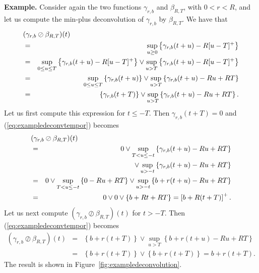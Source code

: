 {\bf Example.} Consider again the two functions $\gamma_{r,b}$ and $\beta_{R,T}$,
with $0 < r < R$, and let us compute the min-plus deconvolution of  $\gamma_{r,b}$ by $\beta_{R,T}$.
We have that
\begin{eqnarray}
\lefteqn{ (\gamma_{r,b} \oslash \beta_{R,T})(t)} \nonumber \\
        & = & \sup_{u \geq 0} \left\{ \gamma_{r,b}(t+u) -  R[u-T]^{+} \right\} \nonumber \\
        & = & \sup_{0 \leq u \leq T} \left\{ \gamma_{r,b}(t+u) -  R[u-T]^{+} \right\}
            \vee \sup_{u > T} \left\{ \gamma_{r,b}(t+u) -  R[u-T]^{+} \right\} \nonumber \\
        & = & \sup_{0 \leq u \leq T} \left\{ \gamma_{r,b}(t+u) \right\}
            \vee \sup_{u > T} \left\{ \gamma_{r,b}(t+u) -  Ru + RT \right\} \nonumber \\
        & = & \left\{ \gamma_{r,b}(t+T) \right\}
            \vee \sup_{u > T} \left\{ \gamma_{r,b}(t+u) -  Ru + RT \right\} .
\mylabel{eq:exampledeconvtempor}
\end{eqnarray}
Let us first compute this expression for $t \leq -T$. Then $\gamma_{r,b}(t+T) = 0$ and
(\ref{eq:exampledeconvtempor}) becomes
\begin{eqnarray*}
\lefteqn{(\gamma_{r,b} \oslash \beta_{R,T})(t)}\\
& = & 0 \vee
\sup_{T < u \leq -t} \left\{ \gamma_{r,b}(t+u) -  Ru + RT \right\}
\\
            & & \hspace{10 ex} \vee \sup_{u > -t} \left\{ \gamma_{r,b}(t+u) -  Ru + RT \right\} \\
        & = & 0 \vee \sup_{T < u \leq -t} \left\{ 0  -  Ru + RT \right\}
                    \vee \sup_{u > -t} \left\{ b+ r(t+u) -  Ru + RT \right\} \\
        & = & 0 \vee 0 \vee \left\{ b + Rt + RT \right\} = \left[ b + R(t+T) \right]^{+} .
\end{eqnarray*}
Let us next compute $(\gamma_{r,b} \oslash \beta_{R,T})(t)$ for $t > -T$. Then (\ref{eq:exampledeconvtempor}) becomes
\begin{eqnarray*}
(\gamma_{r,b} \oslash \beta_{R,T})(t) & = & \left\{ b + r(t+T) \right\} \vee \sup_{u > T} \left\{ b + r(t+u) -  Ru + RT \right\} \\
                & = & \left\{ b + r(t+T) \right\} \vee \left\{ b + r(t+T) \right\} =  b + r(t+T).
\end{eqnarray*}
The result is shown in Figure~\ref{fig:exampledeconvolution}.
\begin{figure}[!htbp]
\end{figure}

